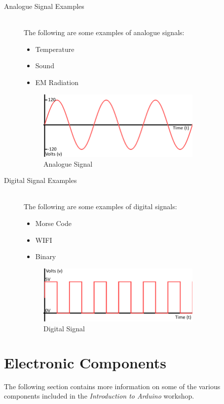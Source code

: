 \begin{description}
	\item[Analogue Signal Examples] \hfill \\
	The following are some examples of analogue signals:
	\begin{itemize}
		\item Temperature
		\item Sound
		\item EM Radiation
	\end{itemize}
	\begin{figure}[ht]
		\centering
		\includegraphics[width=8cm]{images/05}
		\caption{Analogue Signal \citep{lindblom-15}}
		\label{fig:analogue_signal}
	\end{figure}
	
	\item[Digital Signal Examples] \hfill \\
	The following are some examples of digital signals:
	\begin{itemize}
		\item Morse Code
		\item WIFI
		\item Binary
	\end{itemize}
	\begin{figure}[ht]
		\centering
		\includegraphics[width=8cm]{images/06}
		\caption{Digital Signal \citep{lindblom-15}}
		\label{fig:digital_signal}
	\end{figure}
\end{description}





\newpage
\section*{Electronic Components}
The following section contains more information on some of the various components included in the \textit{Introduction to Arduino} workshop. 

